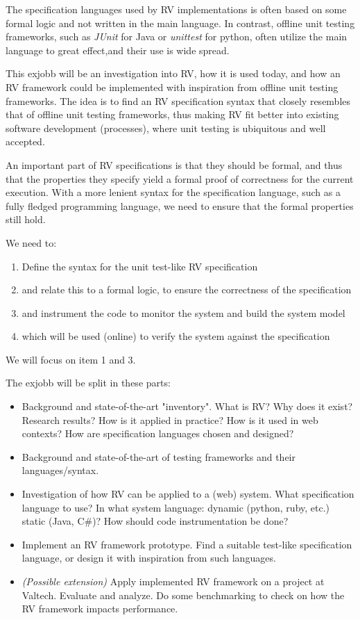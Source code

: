 \documentclass[a4paper,11pt]{kth-mag}
\begin{document}
The specification languages used by RV implementations is often based
on some formal logic and not written in the main language. In contrast,
offline unit testing frameworks, such as \textit{JUnit} for Java or \textit{unittest} for python,
often utilize the main language to great effect,and their use is wide spread.

This exjobb will be an investigation into RV, how it is used today, and how an
RV framework could be implemented with inspiration from offline unit testing
frameworks. The idea is to find an RV specification syntax that closely
resembles that of offline unit testing frameworks, thus making RV fit better into
existing software development (processes), where unit testing is ubiquitous
and well accepted.

An important part of RV specifications is that they should be formal, and thus
that the properties they specify yield a formal proof of correctness for the
current execution. With a more lenient syntax for the specification language, such as
a fully fledged programming language, we need to ensure that the formal properties
still hold.

We need to:

\begin{enumerate}
	\item Define the syntax for the unit test-like RV specification
	\item and relate this to a formal logic, to ensure the correctness of the specification 
	\item and instrument the code to monitor the system and build the system model
	\item which will be used (online) to verify the system against the specification
\end{enumerate}

We will focus on item 1 and 3.

The exjobb will be split in these parts:

\begin{itemize}
	\item Background and state-of-the-art "inventory". What is RV? Why does it
        exist? Research results? How is it applied in practice? How is it used
        in web contexts? How are specification languages chosen and designed?
	\item Background and state-of-the-art of testing frameworks and their
        languages/syntax.
	\item Investigation of how RV can be applied to a (web) system. What
        specification language to use? In what system language: dynamic
        (python, ruby, etc.) static (Java, C\#)? How should code
        instrumentation be done?
	\item Implement an RV framework prototype. Find a suitable test-like
        specification language, or design it with inspiration from such
        languages.
	\item \textit{(Possible extension)}
		Apply implemented RV framework on a project at Valtech. Evaluate and
        analyze. Do some benchmarking to check on how the RV framework impacts
        performance.
\end{itemize}
\end{document}

